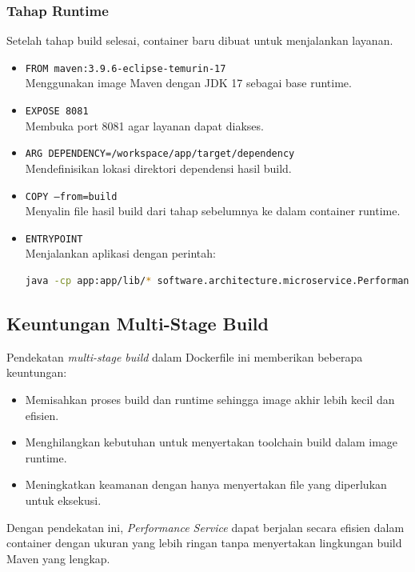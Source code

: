 \subsubsection{Tahap Runtime}
Setelah tahap build selesai, container baru dibuat untuk menjalankan layanan.

\begin{itemize}
	\item \texttt{FROM maven:3.9.6-eclipse-temurin-17} \\
	Menggunakan image Maven dengan JDK 17 sebagai base runtime.
	\item \texttt{EXPOSE 8081} \\
	Membuka port 8081 agar layanan dapat diakses.
	\item \texttt{ARG DEPENDENCY=/workspace/app/target/dependency} \\
	Mendefinisikan lokasi direktori dependensi hasil build.
	\item \texttt{COPY --from=build} \\
	Menyalin file hasil build dari tahap sebelumnya ke dalam container runtime.
	\item \texttt{ENTRYPOINT} \\
	Menjalankan aplikasi dengan perintah:
	\begin{lstlisting}[language=bash]
		java -cp app:app/lib/* software.architecture.microservice.PerformanceServiceApplication
	\end{lstlisting}
\end{itemize}

\subsection{Keuntungan Multi-Stage Build}

Pendekatan \textit{multi-stage build} dalam Dockerfile ini memberikan beberapa keuntungan:
\begin{itemize}
	\item Memisahkan proses build dan runtime sehingga image akhir lebih kecil dan efisien.
	\item Menghilangkan kebutuhan untuk menyertakan toolchain build dalam image runtime.
	\item Meningkatkan keamanan dengan hanya menyertakan file yang diperlukan untuk eksekusi.
\end{itemize}

Dengan pendekatan ini, \textit{Performance Service} dapat berjalan secara efisien dalam container dengan ukuran yang lebih ringan tanpa menyertakan lingkungan build Maven yang lengkap.


